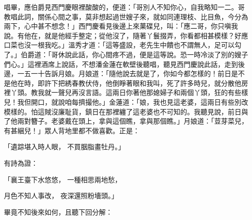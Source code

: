 唱畢，應伯爵見西門慶眼裡酸酸的，便道：「哥別人不知你心，自我略知一二。哥教唱此詞，關係心間之事，莫非想起過世嫂子來，就如同連理枝、比目魚，今分為兩下，心中甚不想念！」西門慶看見後邊上來菓碟兒，叫：「應二哥，你只嗔我說。有他在，就是他經手整定；從他沒了，隨著丫鬟掇弄，你看都相甚模樣？好應口菜也沒一根我吃。」溫秀才道：「這等盛設，老先生中饋也不謂無人，足可以勾了。」伯爵道：「哥休說此話，你心間疼不過，便是這等說。恐一時冷淡了別的嫂子們心。」這裡酒席上說話，不想潘金蓮在軟壁後聽唱，聽見西門慶說此話，走到後邊，一五一十告訴月娘。月娘道：「隨他說去就是了，你如今都怎樣的！前日是不是他在時，即許下把綉春教伏侍，他倒睜著眼和我叫，死了許多時兒，就分散他房裡丫頭。教我就一聲兒再沒言語。這兩日你著他那媳婦子和兩個丫頭，狂的有些樣兒！我但開口，就說咱每擠撮他。」金蓮道：「娘，我也見這老婆，這兩日有些別改模樣的。怕這賊沒廉耻貨，鎮日在那裡纏了這老婆也不可知的。我聽見說，前日與了他兩對簪子。老婆戴在頭上，拿與這個瞧，拿與那個瞧。」月娘道：「荳芽菜兒，有甚綑兒！」眾人背地里都不做喜歡。正是：

「遺踪堪入時人眼，  不買胭脂畫牡丹。」

有詩為證：

「襄王臺下水悠悠，  一種相思兩地愁，

月色不知人事改，  夜深還照粉墻頭。」

畢竟不知後來如何，且聽下回分解：
